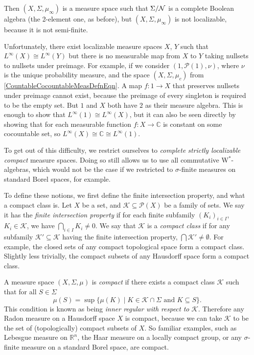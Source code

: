 \documentclass[reqno,T1]{amsproc}
\newcommand{\R}{\mathbb{R}}
\newcommand{\C}{\mathbb{C}}
\newcommand{\Kay}{\mathcal{K}} %
\newcommand{\powerset}{\mathcal{P}}
\theoremstyle{plain}
\theoremstyle{remark}
\numberwithin{equation}{section}
\begin{document}
Then $(X,\Sigma,\mu_\infty)$ is a measure space such that $\Sigma / \mathcal{N}$ is a complete Boolean algebra (the 2-element one, as before), but $(X,\Sigma,\mu_\infty)$ is not localizable, because it is not semi-finite. 

Unfortunately, there exist localizable measure spaces $X$, $Y$ such that $L^\infty(X) \cong L^\infty(Y)$ but there is no measurable map from $X$ to $Y$ taking nullsets to nullsets under preimage. For example, if we consider $(1,\powerset(1),\nu)$, where $\nu$ is the unique probability measure, and the space $(X,\Sigma,\mu_c)$ from \eqref{CountableCocountableMeasDefnEqn}. A map $f: 1 \rightarrow X$ that preserves nullsets under preimage cannot exist, because the preimage of every singleton is required to be the empty set. But $1$ and $X$ both have $2$ as their measure algebra. This is enough to show that $L^\infty(1) \cong L^\infty(X)$, but it can also be seen directly by showing that for each measurable function $f : X \rightarrow \C$ is constant on some cocountable set, so $L^\infty(X) \cong \C \cong L^\infty(1)$. 

To get out of this difficulty, we restrict ourselves to \emph{complete strictly localizable compact} measure spaces. Doing so still allows us to use all commutative W$^*$-algebras, which would not be the case if we restricted to $\sigma$-finite measures on standard Borel spaces, for example.

To define these notions, we first define the finite intersection property, and what a compact class is. Let $X$ be a set, and $\Kay \subseteq \powerset(X)$ be a family of sets. We say it has the \emph{finite intersection property} if for each finite subfamily $(K_i)_{i \in I}$, $K_i \in \Kay$, we have $\bigcap_{i \in I} K_i \neq 0$. We say that $\Kay$ is a \emph{compact class} if for any subfamily $\Kay' \subseteq \Kay$ having the finite intersection property, $\bigcap \Kay' \neq \emptyset$. For example, the closed sets of any compact topological space form a compact class. Slightly less trivially, the compact subsets of any Hausdorff space form a compact class. 

A measure space $(X,\Sigma,\mu)$ is \emph{compact} \cite[342A(c)]{fremlin3} if there exists a compact class $\Kay$ such that for all $S \in \Sigma$
\[
\mu(S) = \sup \{ \mu(K) \mid K \in \Kay \cap \Sigma \text{ and } K \subseteq S \}.
\]
This condition is known as being \emph{inner regular with respect to} $\Kay$. Therefore any Radon measure on a Hausdorff space $X$ is compact, because we can take $\Kay$ to be the set of (topologically) compact subsets of $X$. So familiar examples, such as Lebesgue measure on $\R^n$, the Haar measure on a locally compact group, or any $\sigma$-finite measure on a standard Borel space, are compact.
\end{document}
